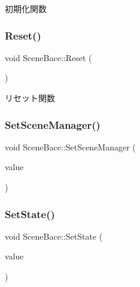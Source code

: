 初期化関数 

\mbox{\label{class_scene_bace_a21b95dfce1c7be78da9d8dfaed56c8d1}} 
\subsubsection{\texorpdfstring{Reset()}{Reset()}}
{\footnotesize\ttfamily void Scene\+Bace\+::\+Reset (\begin{DoxyParamCaption}{ }\end{DoxyParamCaption})}



リセット関数 

\mbox{\label{class_scene_bace_a6ee6ef2a67b44af5c9082c1759ece37d}} 
\subsubsection{\texorpdfstring{Set\+Scene\+Manager()}{SetSceneManager()}}
{\footnotesize\ttfamily void Scene\+Bace\+::\+Set\+Scene\+Manager (\begin{DoxyParamCaption}\item[{\mbox{\hyperlink{class_scene_manager}{Scene\+Manager}} $\ast$}]{value }\end{DoxyParamCaption})\hspace{0.3cm}{\ttfamily [inline]}}

\mbox{\label{class_scene_bace_afdec2b31d015629392ada142fe0ce3c7}} 
\subsubsection{\texorpdfstring{Set\+State()}{SetState()}}
{\footnotesize\ttfamily void Scene\+Bace\+::\+Set\+State (\begin{DoxyParamCaption}\item[{\mbox{\hyperlink{class_scene_bace_1_1_state_abstract}{State\+Abstract}} $\ast$}]{value }\end{DoxyParamCaption})\hspace{0.3cm}{\ttfamily [inline]}}

